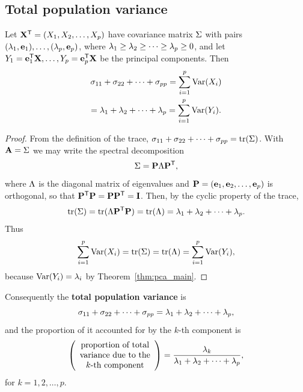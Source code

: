 \subsection{Total population variance}
\label{subsec:total_variance}

\begin{theorem}
  \label{thm:total_variance}
  Let $\mathbf{X}^{\mathsf{T}}=(X_1,X_2,\dots,X_p)$ have covariance matrix $\Sigma$ with pairs
  $(\lambda_1,\mathbf{e}_1),\dots,(\lambda_p,\mathbf{e}_p)$, where
  $\lambda_1\ge\lambda_2\ge\dots\ge\lambda_p\ge0$, and let
  $Y_1=\mathbf{e}_1^{\mathsf{T}}\mathbf{X},\dots,Y_p=\mathbf{e}_p^{\mathsf{T}}\mathbf{X}$ be the principal
  components. Then
  \begin{multline}
    \label{eq:total_variance}
    \sigma_{11}+\sigma_{22}+\dots+\sigma_{pp}=\sum_{i=1}^{p}\operatorname{Var}(X_i)\\
    =\lambda_1+\lambda_2+\dots+\lambda_p=\sum_{i=1}^{p}\operatorname{Var}(Y_i).
  \end{multline}
\end{theorem}

\begin{proof}
  From the definition of the trace,
  $\sigma_{11}+\sigma_{22}+\dots+\sigma_{pp}=\operatorname{tr}(\Sigma)$. With $\mathbf{A}=\Sigma$ we may write
  the spectral decomposition
  \[
    \Sigma=\mathbf{P}\Lambda\mathbf{P}^{\mathsf{T}},
  \]
  where $\Lambda$ is the diagonal matrix of eigenvalues and
  $\mathbf{P}=(\mathbf{e}_1,\mathbf{e}_2,\dots,\mathbf{e}_p)$ is orthogonal, so that
  $\mathbf{P}^{\mathsf{T}}\mathbf{P}=\mathbf{P}\mathbf{P}^{\mathsf{T}}=\mathbf{I}$. Then, by the cyclic property of
  the trace,
  \[
    \operatorname{tr}(\Sigma)=\operatorname{tr}(\Lambda\mathbf{P}^{\mathsf{T}}\mathbf{P})=\operatorname{tr}(\Lambda)
    =\lambda_1+\lambda_2+\dots+\lambda_p.
  \]
  Thus
  \[
    \sum_{i=1}^{p}\operatorname{Var}(X_i)=\operatorname{tr}(\Sigma)=\operatorname{tr}(\Lambda)=\sum_{i=1}^{p}\operatorname{Var}(Y_i),
  \]
  because $\operatorname{Var}(Y_i)=\lambda_i$ by Theorem~\ref{thm:pca_main}.
\end{proof}

Consequently the \textbf{total population variance} is
\begin{equation}
  \label{eq:total_pop_variance}
  \sigma_{11}+\sigma_{22}+\dots+\sigma_{pp}=\lambda_1+\lambda_2+\dots+\lambda_p,
\end{equation}
and the proportion of it accounted for by the $k$-th component is
\begin{equation}
  \label{eq:proportion_variance}
  \left( \begin{array}{c}
    \text{proportion of total}\\
    \text{variance due to the}\\
    \text{$k$-th component}
  \end{array} \right)
  =\frac{\lambda_k}{\lambda_1+\lambda_2+\dots+\lambda_p},
\end{equation}
for $k=1,2,\dots,p$.


